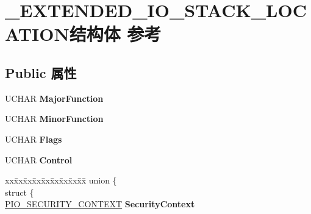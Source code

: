 \hypertarget{struct___e_x_t_e_n_d_e_d___i_o___s_t_a_c_k___l_o_c_a_t_i_o_n}{}\section{\+\_\+\+E\+X\+T\+E\+N\+D\+E\+D\+\_\+\+I\+O\+\_\+\+S\+T\+A\+C\+K\+\_\+\+L\+O\+C\+A\+T\+I\+O\+N结构体 参考}
\label{struct___e_x_t_e_n_d_e_d___i_o___s_t_a_c_k___l_o_c_a_t_i_o_n}
\subsection*{Public 属性}
\begin{DoxyCompactItemize}
\item 
\mbox{\label{struct___e_x_t_e_n_d_e_d___i_o___s_t_a_c_k___l_o_c_a_t_i_o_n_aa9a4933626bbd07e9e4fe4acaf35a9c3}} 
U\+C\+H\+AR {\bfseries Major\+Function}
\item 
\mbox{\label{struct___e_x_t_e_n_d_e_d___i_o___s_t_a_c_k___l_o_c_a_t_i_o_n_ab837a178b4ee8a6891a74e70df287332}} 
U\+C\+H\+AR {\bfseries Minor\+Function}
\item 
\mbox{\label{struct___e_x_t_e_n_d_e_d___i_o___s_t_a_c_k___l_o_c_a_t_i_o_n_a031e20eb283c7bb3e8e03a55f3769ae8}} 
U\+C\+H\+AR {\bfseries Flags}
\item 
\mbox{\label{struct___e_x_t_e_n_d_e_d___i_o___s_t_a_c_k___l_o_c_a_t_i_o_n_a33bd62bd7097f4d205d7ea164d8dd001}} 
U\+C\+H\+AR {\bfseries Control}
\item 
\mbox{\label{struct___e_x_t_e_n_d_e_d___i_o___s_t_a_c_k___l_o_c_a_t_i_o_n_a76709710f70c30617a0b51cd3663a38f}} 
\begin{tabbing}
xx\=xx\=xx\=xx\=xx\=xx\=xx\=xx\=xx\=\kill
union \{\\
\>struct \{\\
\>\>\hyperlink{struct___i_o___s_e_c_u_r_i_t_y___c_o_n_t_e_x_t}{PIO\_SECURITY\_CONTEXT} {\bfseries SecurityContext}\\

\end{tabbing}
\end{DoxyCompactItemize}
